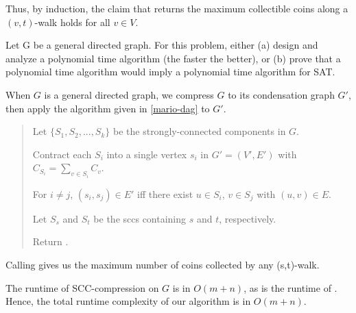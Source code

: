 \documentclass{article}
\begin{document}
\begin{solution}
\begin{subproof} [Correctness]
Thus, by induction, the claim that  returns the maximum collectible coins along a $(v,t)$-walk holds for all $v \in V$.
\end{subproof}

\end{solution}
\pagebreak



\begin{subexercise}
Let G be a general directed graph.
For this problem, either (a) design and analyze a polynomial time algorithm (the faster the better), or (b) prove that a polynomial time algorithm would imply a polynomial time algorithm for SAT.
\end{subexercise}

\begin{solution}
When $G$ is a general directed graph, we compress $G$ to its condensation graph $G'$, then apply the algorithm given in \ref{mario-dag} to $G'$.

\begin{quote}%



\begin{steps}
    \item Let $\{S_1, S_2, ..., S_k\}$ be the strongly-connected components in $G$.
    \item Contract each $S_i$ into a single vertex $s_i$ in $G' = (V', E')$ with $C_{S_i} = \sum_{ v\in S_i} C_v$.
    \item For $i \not= j$, $(s_i, s_j) \in E'$ iff there exist $u \in S_i$, $v \in S_j$ with $(u,v) \in E$.
    \item Let $S_s$ and $S_t$ be the sccs containing $s$ and $t$, respectively.
    \item Return .
\end{steps}
\end{quote}

Calling  gives us the maximum number of coins collected by any (s,t)-walk.


\begin{subproof}[Runtime]
The runtime of SCC-compression on $G$ is in $O(m+n)$, as is the runtime of . Hence, the total runtime complexity of our algorithm is in $O(m+n)$.
\end{subproof}



\end{solution}
\end{document}

